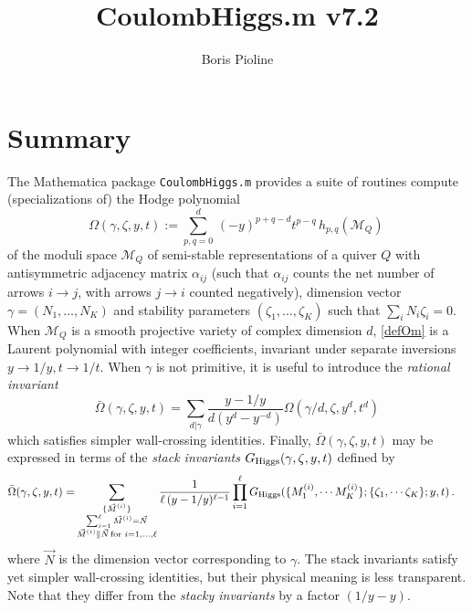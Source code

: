 \documentclass[12pt]{JHEP3}
\title{CoulombHiggs.m v7.2}
\author{Boris Pioline}
\newcommand{\be}{\begin{equation}}
\newcommand{\ee}{\end{equation}}
\newcommand\bOm{\bar\Omega}
\newcommand{\cM}{\mathcal{M}}
\newcommand{\gR}{G_{\rm Higgs}}
\begin{document}
\maketitle

\baselineskip 15pt

\tableofcontents

\medskip

\section{Summary}

The  {\sc Mathematica} package {\tt CoulombHiggs.m} provides a suite of routines compute (specializations of) the Hodge polynomial 
\be
\label{defOm}
\Omega(\gamma,\zeta,y,t) := 
\sum_{p,q=0}^{d}\, (-y)^{p+q-d} t^{p-q}\, h_{p,q}(\cM_Q)\, 
\ee
of the moduli space $\cM_Q$ of semi-stable representations of a quiver $Q$ with antisymmetric
adjacency matrix $\alpha_{ij}$ (such that $\alpha_{ij}$ counts the net number of arrows $i\to j$, with
arrows $j\to i$ counted negatively),  dimension vector $\gamma=(N_1,\dots, N_K)$ and stability parameters $(\zeta_1,\dots, \zeta_K)$ such that $\sum_i N_i \zeta_i=0$. When $\cM_Q$ is 
a smooth projective variety of complex dimension $d$, \eqref{defOm} is a Laurent polynomial  with integer coefficients, invariant under separate inversions $y\to 1/y, t\to 1/t$. When $\gamma$ is not primitive, it is useful to introduce the {\it rational invariant}
\be
\label{defbOm}
\bOm(\gamma,\zeta,y,t)=\sum_{d|\gamma} \frac{y-1/y}{d(y^d-y^{-d})} \Omega(\gamma/d,\zeta,y^d,t^d)\ee 
which satisfies simpler wall-crossing identities. Finally, $\bOm(\gamma,\zeta,y,t)$ may be expressed 
in terms of the {\it stack invariants} $G_{\rm Higgs}(\gamma,\zeta,y,t)$ defined by \cite[(4.1)]{Manschot:2013sya}
\be
\label{eq:inversestackinv}
\begin{split}
\bOm(\gamma,\zeta,y,t) 
  =& %
  \sum_{\substack{\{\vec M^{(i)}\} \\
  \sum_{i=1}^\ell \vec M^{(i)}=\vec N \\  \vec M^{(i)}\parallel \vec N
  \,\mathrm{for}\,\, i=1,\dots,\ell}}
\frac{1}{\ell\,(y-1/y)^{\ell-1}}  
\prod_{i=1}^\ell 
\gR(\{ M^{(i)}_1, \cdots M^{(i)}_K \};
\{\zeta_1, \cdots \zeta_K\};y,t)
\, .  
\end{split}
\ee
where $\vec N$ is the dimension vector corresponding to $\gamma$. The stack invariants 
satisfy yet simpler wall-crossing identities, but their physical meaning is less transparent.
Note that they differ from the {\it stacky invariants} by a factor $(1/y-y)$.
\end{document}
